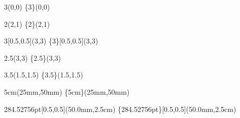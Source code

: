 \documentclass{article}
\begin{document}
\begin{textblock}{3}(0,0)
\{3\}(0,0)
\end{textblock}

\begin{textblock}{2}(2,1)
\{2\}(2,1)
\end{textblock}

\begin{textblock}{3}[0.5,0.5](3,3)
\{3\}[0.5,0.5](3,3)
\end{textblock}

\begin{textblock}{2.5}(3,3)
\{2.5\}(3,3)
\end{textblock}

\begin{textblock}{3.5}(1.5,1.5)
\{3.5\}(1.5,1.5)
\end{textblock}

\begin{textblock*}{5cm}(25mm,50mm)
\{5cm\}(25mm,50mm)
\end{textblock*}

\begin{textblock*}{284.52756pt}[0.5,0.5](50.0mm,2.5cm)
\{284.52756pt\}[0.5,0.5](50.0mm,2.5cm)
\end{textblock*}
\end{document}
